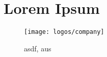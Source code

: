 
\chapter{Lorem Ipsum}
\lipsum[1] %

\begin{figure}[h]
	\centering
	\texttt{[image: logos/company]}
	\caption{asdf, aus \protect\cite{stroetmann:97}}
\end{figure}